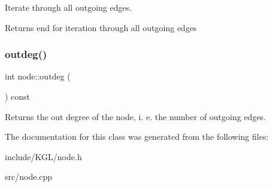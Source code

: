 Iterate through all outgoing edges.

\begin{DoxyReturn}{Returns}
end for iteration through all outgoing edges 
\end{DoxyReturn}
\mbox{\label{classnode_a32adc45c4132e2642ccd2233d79ffe67}} 
\subsubsection{\texorpdfstring{outdeg()}{outdeg()}}
{\footnotesize\ttfamily int node\+::outdeg (\begin{DoxyParamCaption}{ }\end{DoxyParamCaption}) const}

Returns the out degree of the node, i. e. the number of outgoing edges. 

The documentation for this class was generated from the following files\+:\begin{DoxyCompactItemize}
\item 
include/\+K\+G\+L/node.\+h\item 
src/node.\+cpp\end{DoxyCompactItemize}
